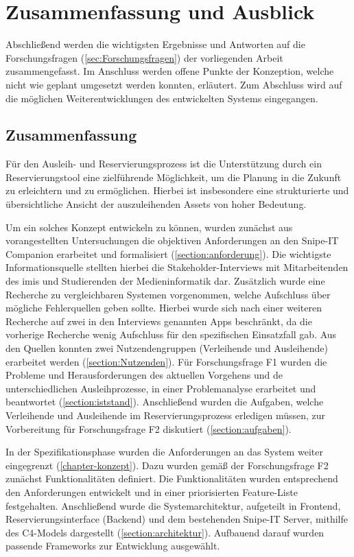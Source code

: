 
\chapter{Zusammenfassung und Ausblick}
\label{chapter-fazit}

Abschließend werden die wichtigsten Ergebnisse und Antworten auf die
Forschungsfragen (\ref{sec:Forschungsfragen}) der vorliegenden Arbeit
zusammengefasst. Im Anschluss werden offene Punkte der Konzeption, welche nicht
wie geplant umgesetzt werden konnten, erläutert. Zum Abschluss wird auf die
möglichen Weiterentwicklungen des entwickelten Systems eingegangen.


\section{Zusammenfassung}
Für den Ausleih- und Reservierungsprozess ist die Unterstützung durch ein
Reservierungstool eine zielführende Möglichkeit, um die Planung in die Zukunft
zu erleichtern und zu ermöglichen. Hierbei ist insbesondere eine strukturierte und
übersichtliche Ansicht der auszuleihenden Assets von hoher Bedeutung.

Um ein solches Konzept entwickeln zu können, wurden zunächst aus vorangestellten
Untersuchungen die objektiven Anforderungen an den Snipe-IT Companion erarbeitet
und formalisiert (\ref{section:anforderung}). Die wichtigste Informationsquelle
stellten hierbei die Stakeholder-Interviews mit Mitarbeitenden des \ac{imis} und
Studierenden der Medieninformatik dar. Zusätzlich wurde eine Recherche zu
vergleichbaren Systemen vorgenommen, welche Aufschluss über mögliche
Fehlerquellen geben sollte. Hierbei wurde sich nach einer weiteren Recherche auf
zwei in den Interviews genannten Apps beschränkt, da die vorherige Recherche
wenig Aufschluss für den spezifischen Einsatzfall gab. Aus den Quellen konnten
zwei Nutzendengruppen (Verleihende und Ausleihende) erarbeitet werden
(\ref{section:Nutzenden}). Für Forschungsfrage F1 wurden die Probleme und
Herausforderungen des aktuellen Vorgehens und de unterschiedlichen
Ausleihprozesse, in einer Problemanalyse erarbeitet und beantwortet
(\ref{section:iststand}). Anschließend wurden die Aufgaben, welche Verleihende
und Ausleihende im Reservierungsprozess erledigen müssen, zur Vorbereitung für
Forschungsfrage F2 diskutiert (\ref{section:aufgaben}).

In der Spezifikationsphase wurden die Anforderungen an das System weiter
eingegrenzt (\ref{chapter-konzept}). Dazu wurden gemäß der Forschungsfrage F2 zunächst
Funktionalitäten definiert. Die Funktionalitäten wurden entsprechend
den Anforderungen entwickelt und in einer priorisierten Feature-Liste
festgehalten. Anschließend wurde die Systemarchitektur, aufgeteilt in Frontend,
Reservierungsinterface (Backend) und dem bestehenden Snipe-IT Server, mithilfe
des C4-Models dargestellt (\ref{section:architektur}). Aufbauend darauf wurden
passende Frameworks zur Entwicklung ausgewählt.

